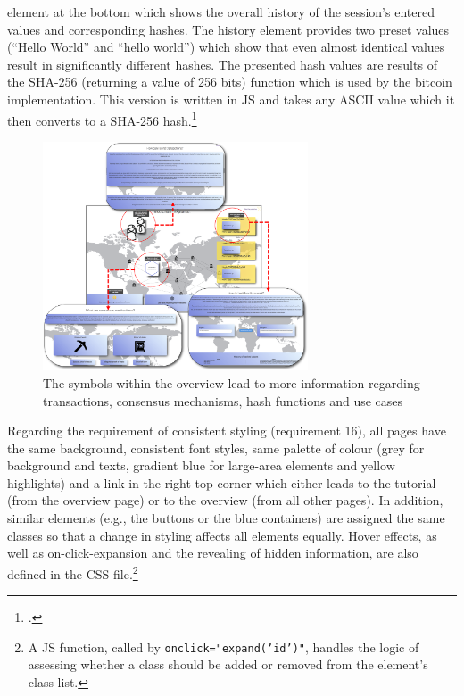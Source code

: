 element at the bottom which shows the overall history of the session's entered values and corresponding hashes. The history element provides two preset values (\enquote{Hello World} and \enquote{hello world}) which show that even almost identical values result in significantly different hashes. The presented hash values are results of the \ac{SHA}-256 (returning a value of 256 bits) function which is used by the bitcoin implementation. This version is written in \acl{JS} and takes any ASCII value which it then converts to a \ac{SHA}-256 hash.\footcite[][]{LuffJavaScriptSHA256demo2014}

\begin{figure}
    \centering
    \includegraphics[width=0.7\textwidth]{latex-vorlage_v1.5/graphics/overview.png}
    \caption[The symbols within the overview lead to more information regarding transactions, consensus mechanisms, hash functions and use cases]{The symbols within the overview lead to more information regarding transactions, consensus mechanisms, hash functions and use cases\protect\footnotemark}
    \label{fig:AniOW}
\end{figure}

Regarding the requirement of consistent styling (requirement 16), all pages have the same background, consistent font styles, same palette of colour (grey for background and texts, gradient blue for large-area elements and yellow highlights) and a link in the right top corner which either leads to the tutorial (from the overview page) or to the overview (from all other pages). In addition, similar elements (e.g., the buttons or the blue containers) are assigned the same classes so that a change in styling affects all elements equally. Hover effects, as well as on-click-expansion and the revealing of hidden information, are also defined in the \ac{CSS} file.\footnote{A \ac{JS} function, called by \texttt{onclick="expand('id')"}, handles the logic of assessing whether a class should be added or removed from the element's class list.} 


